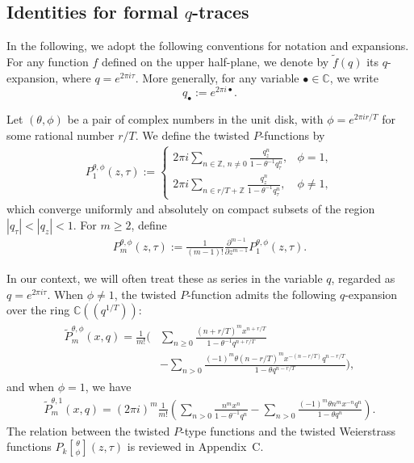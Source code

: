 \documentclass[9pt]{amsart}
\begin{document}
\subsection{Identities for formal \texorpdfstring{$q$}{Lg}-traces}
In the following, we adopt the following conventions for notation and expansions. For any function \( f \) defined on the upper half-plane, we denote by \( \tilde{f}(q) \) its \( q \)-expansion, where \( q = e^{2\pi i \tau} \). More generally, for any variable \( \bullet \in \mathbb{C} \), we write
\[
q_\bullet := e^{2\pi i \bullet}.
\]

Let \( (\theta, \phi) \) be a pair of complex numbers in the unit disk, with \( \phi = e^{2\pi i r/T} \) for some rational number \( r/T \). We define the twisted \( P \)-functions by
\begin{align}\label{pqfunction3}
  P_{1}^{\theta,\phi}(z,\tau) := 
  \begin{cases}
    2\pi i \displaystyle\sum_{n \in \mathbb{Z},\, n \neq 0} \frac{q_z^n}{1 - \theta^{-1} q_\tau^n}, & \phi = 1, \\[2mm]
    2\pi i \displaystyle\sum_{n \in r/T + \mathbb{Z}} \frac{q_z^n}{1 - \theta^{-1} q_\tau^n}, & \phi \neq 1,
  \end{cases}
\end{align}
which converge uniformly and absolutely on compact subsets of the region \( |q_\tau| < |q_z| < 1 \). For \( m \geq 2 \), define
\begin{align}\label{pqfunction7}
  P_{m}^{\theta,\phi}(z,\tau) := \frac{1}{(m-1)!} \frac{\partial^{m-1}}{\partial z^{m-1}} P_{1}^{\theta,\phi}(z,\tau).
\end{align}

In our context, we will often treat these as series in the variable \( q \), regarded as \( q = e^{2\pi i \tau} \). When \( \phi \neq 1 \), the twisted \( P \)-function admits the following \( q \)-expansion over the ring \( \mathbb{C}((q^{1/T})) \):
\begin{align}
\begin{split}
\tilde{P}_m^{\theta, \phi}(x, q) = \frac{1}{m!} \Bigg( 
&\sum_{n \geq 0} \frac{(n + r/T)^m x^{n + r/T}}{1 - \theta^{-1} q^{n + r/T}} \\
&- \sum_{n > 0} \frac{(-1)^m \theta (n - r/T)^m x^{-(n - r/T)} q^{n - r/T}}{1 - \theta q^{n - r/T}} 
\Bigg),
\end{split}
\end{align}
and when \( \phi = 1 \), we have
\begin{align}\label{pqfunction8}
\tilde{P}_m^{\theta, 1}(x, q) = (2\pi i)^m \frac{1}{m!} \left( 
\sum_{n > 0} \frac{n^m x^n}{1 - \theta^{-1} q^n} 
- \sum_{n > 0} \frac{(-1)^m \theta n^m x^{-n} q^n}{1 - \theta q^n} 
\right).
\end{align}
The relation between the twisted $P$-type functions and the twisted Weierstrass functions \( P_k\genfrac[]{0pt}{0}{\theta}{\phi}(z,\tau) \) is reviewed in Appendix~C.
\end{document}
